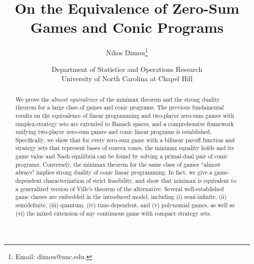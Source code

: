 \documentclass[11pt, twoside]{article}
\numberwithin{equation}{section}
\theoremstyle{definition}
\begin{document}
\title{\textbf{On the Equivalence of Zero-Sum Games and Conic Programs}} 
\author{Nikos Dimou\footnote{Email: dimou@unc.edu.}}

\date{Department of Statistics and Operations Research\\University of North Carolina at Chapel Hill}

\maketitle


\pagestyle{myheadings}
\pagestyle{plain}





\begin{abstract}
We prove the \textit{almost equivalence} of the minimax theorem and the strong duality theorem for a large class of games and conic programs. The previous fundamental results on the equivalence of linear programming and two-player zero-sum games with simplex-strategy sets are extended to Banach spaces, and a comprehensive framework unifying two-player zero-sum games and conic linear programs is established. Specifically, we show that for every zero-sum game with a bilinear payoff function and strategy sets that represent bases of convex cones, the minimax equality holds and its game value and Nash equilibria can be found by solving a primal-dual pair of conic programs. Conversely, the minimax theorem for the same class of games ``almost always" implies strong duality of conic linear programming. In fact, we give a game-dependent characterization of strict feasibility, and show that minimax is equivalent to a generalized version of Ville's theorem of the alternative. Several well-established game classes are embedded in the introduced model, including (i) semi-infinite, (ii) semidefinite, (iii) quantum, (iv) time-dependent, and (v) polynomial games, as well as (vi) the mixed extension of any continuous game with compact strategy sets.
\end{abstract}
\end{document}
